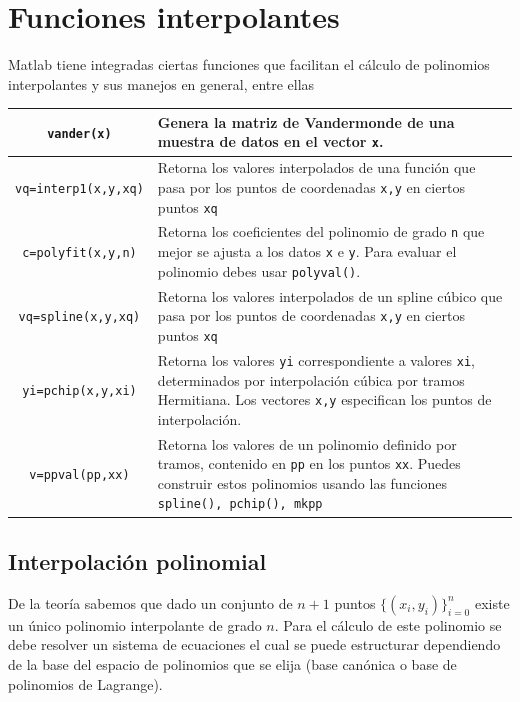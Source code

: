 \documentclass[11pt]{article}
\begin{document}


\section{Funciones interpolantes}


Matlab tiene integradas ciertas funciones que facilitan el c\'alculo de polinomios interpolantes y sus manejos en general, entre ellas

\begin{longtable}{||c|p{}||}
\hline
\texttt{vander(x)} 			& Genera la matriz de Vandermonde de una muestra de datos en el vector \texttt{x}. \\
\hline
\texttt{vq=interp1(x,y,xq)}	& Retorna los valores interpolados de una funci\'on que pasa por los puntos de coordenadas \texttt{x,y} en ciertos puntos \texttt{xq} \\
\hline
\texttt{c=polyfit(x,y,n)}	& Retorna los coeficientes del polinomio de grado \texttt{n} que mejor se ajusta a los datos \texttt{x} e  \texttt{y}. Para evaluar el polinomio debes usar \texttt{polyval()}. \\
\hline
\texttt{vq=spline(x,y,xq)}	& Retorna los valores interpolados de un spline c\'ubico que pasa por los puntos de coordenadas \texttt{x,y} en ciertos puntos \texttt{xq} \\
\hline 
\texttt{yi=pchip(x,y,xi)}	& Retorna los valores \texttt{yi} correspondiente a valores \texttt{xi}, determinados por interpolaci\'on c\'ubica por tramos Hermitiana. Los vectores \texttt{x,y} especifican los puntos de interpolaci\'on. \\
\hline
\texttt{v=ppval(pp,xx)}		& Retorna los valores de un polinomio definido por tramos, contenido en \texttt{pp} en los puntos \texttt{xx}. Puedes construir estos polinomios usando las funciones \texttt{spline(), pchip(), mkpp} 
\\
\hline
\end{longtable}


\subsection{Interpolaci\'on polinomial}
De la teor\'ia sabemos que dado un conjunto de $n+1$ puntos $\{(x_i,y_i)\}_{i=0}^{n}$ existe un \'unico polinomio interpolante de grado $n$. Para el c\'alculo de este polinomio se debe resolver un sistema de ecuaciones el cual se puede estructurar dependiendo de la base del espacio de polinomios que se elija (base can\'onica o base de polinomios de Lagrange). 
\end{document}
